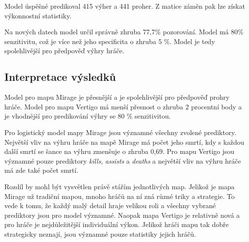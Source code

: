 

Model úspěšné predikoval 415 výher a 441 proher. Z matice záměn pak lze získat výkonnostní statistiky.



Na nových datech model určil správně zhruba 77,7\% pozorování. Model má 80\% senzitivitu, což je více než jeho specificita o zhruba 5 \%. Model je tedy spolehlivější
pro předpověď výhry hráče.

\subsection{Interpretace výsledků}
Model pro mapu Mirage je přesnější a je spolehlivější pro předpověď prohry hráče. Model pro mapu Vertigo má menší přesnost o zhruba 
2 procentní body a je vhodnější pro predikování výhry se 80 \% senzitivitou.

Pro logistický model mapy Mirage jsou významné všechny zvolené prediktory. Největší vliv na výhru hráče na mapě Mirage má počet jeho smrtí, kdy s každou další smrtí se šance
na výhru zmenšuje o zhruba 0,69. Pro mapu Vertigo jsou významné pouze prediktory \textit{kills}, \textit{assists} a \textit{deaths} a největší vliv na výhru hráče
má zde také počet smrtí.

Rozdíl by mohl být vysvětlen právě stářím jednotlivých map. Jelikož je mapa Mirage už tradiční mapou, mnoho hráčů na ní zná různé triky a strategie. To vede k tomu, že
každý malý detail hraje velikou roli a všechny vybrané prediktory jsou pro model významné. Naopak mapa Vertigo je relativně nová a pro hráče je nejdůležitější individuální
výkon. Jelikož hráči mapu tak dobře strategicky neznají, jsou významné pouze statistiky jejich hráčů.